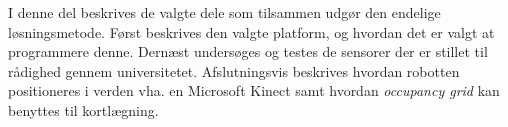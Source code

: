 I denne del beskrives de valgte dele som tilsammen udgør den endelige løsningsmetode.
Først beskrives den valgte platform, og hvordan det er valgt at programmere denne.
Dernæst undersøges og testes de sensorer der er stillet til rådighed gennem universitetet.
Afslutningsvis beskrives hvordan robotten positioneres i verden vha. en Microsoft Kinect samt hvordan \textit{occupancy grid} kan benyttes til kortlægning.
